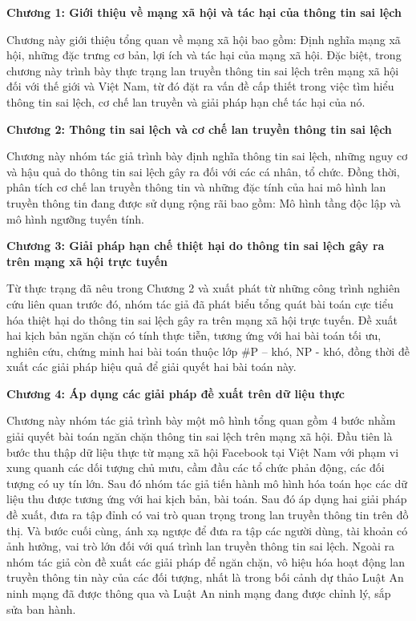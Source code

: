 {\bfseries Chương 1: Giới thiệu về mạng xã hội và tác hại của thông tin sai lệch}

Chương này giới thiệu tổng quan về mạng xã hội bao gồm: Định nghĩa mạng xã hội, những đặc trưng cơ bản, lợi ích và tác hại của mạng xã hội. Đặc biệt, trong chương này trình bày thực trạng lan truyền thông tin sai lệch trên mạng xã hội đối với thế giới và Việt Nam, từ đó đặt ra vấn đề cấp thiết trong việc tìm hiểu thông tin sai lệch, cơ chế lan truyền và giải pháp hạn chế tác hại của nó.

{\bfseries Chương 2: Thông tin sai lệch và cơ chế lan truyền thông tin sai lệch}

Chương này nhóm tác giả trình bày định nghĩa thông tin sai lệch, những nguy cơ và hậu quả do thông tin sai lệch gây ra đối với các cá nhân, tổ chức. Đồng thời, phân tích cơ chế lan truyền thông tin và những đặc tính của hai mô hình lan truyền thông tin đang được sử dụng rộng rãi bao gồm: Mô hình tầng độc lập và mô hình ngưỡng tuyến tính.

{\bfseries Chương 3: Giải pháp hạn chế thiệt hại do thông tin sai lệch gây ra trên mạng xã hội trực tuyến}

Từ thực trạng đã nêu trong Chương 2 và xuất phát từ những công trình nghiên cứu liên quan trước đó, nhóm tác giả đã phát biểu tổng quát bài toán cực tiểu hóa thiệt hại do thông tin sai lệch gây ra trên mạng xã hội trực tuyến. Đề xuất hai kịch bản ngăn chặn có tính thực tiễn, tương ứng với hai bài toán tối ưu, nghiên cứu, chứng minh hai bài toán thuộc lớp \#P – khó, NP - khó, đồng thời đề xuất các giải pháp hiệu quả để giải quyết hai bài toán này.

{\bfseries Chương 4: Áp dụng các giải pháp đề xuất trên dữ liệu thực}

Chương này nhóm tác giả trình bày một mô hình tổng quan gồm 4 bước nhằm giải quyết bài toán ngăn chặn thông tin sai lệch trên mạng xã hội. Đầu tiên là bước thu thập dữ liệu thực từ mạng xã hội Facebook tại Việt Nam với phạm vi xung quanh các dối tượng chủ mưu, cầm đầu các tổ chức phản động, các đối tượng có uy tín lớn. Sau đó nhóm tác giả tiến hành mô hình hóa toán học các dữ liệu thu được tương ứng với hai kịch bản, bài toán. Sau đó áp dụng hai giải pháp đề xuất, đưa ra tập đỉnh có vai trò quan trọng trong lan truyền thông tin trên đồ thị. Và bước cuối cùng, ánh xạ ngược để đưa ra tập các người dùng, tài khoản có ảnh hưởng, vai trò lớn đối với quá trình lan truyền thông tin sai lệch. Ngoài ra nhóm tác giả còn đề xuất các giải pháp để ngăn chặn, vô hiệu hóa hoạt động lan truyền thông tin này của các đối tượng, nhất là trong bối cảnh dự thảo Luật An ninh mạng đã được thông qua và Luật An ninh mạng đang được chỉnh lý, sắp sửa ban hành.